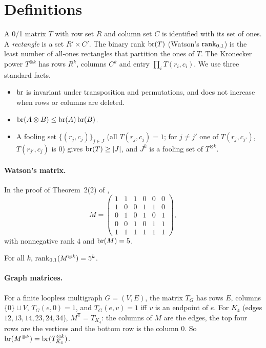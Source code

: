 \section{Definitions}

A 0/1 matrix $T$ with row set $R$ and column set $C$ is identified with its set of ones. A \emph{rectangle} is a set $R'\times C'$. The binary rank $\operatorname{br}(T)$ (Watson's $\operatorname{rank}_{0,1}$) is the least number of all-ones rectangles that partition the ones of $T$. The Kronecker power $T^{\otimes k}$ has rows $R^k$, columns $C^k$ and entry $\prod_i T(r_i,c_i)$. We use three standard facts.
\begin{itemize}
\item[(F1)] $\operatorname{br}$ is invariant under transposition and permutations, and does not increase when rows or columns are deleted.
\item[(F2)] $\operatorname{br}(A\otimes B)\le\operatorname{br}(A)\operatorname{br}(B)$.
\item[(F3)] A fooling set $\{(r_j,c_j)\}_{j\in J}$ (all $T(r_j,c_j)=1$; for $j\neq j'$ one of $T(r_j,c_{j'})$, $T(r_{j'},c_j)$ is $0$) gives $\operatorname{br}(T)\ge|J|$, and $J^k$ is a fooling set of $T^{\otimes k}$.
\end{itemize}

\paragraph{Watson's matrix.} In the proof of Theorem~2(2) of \cite{Wa16},
\[
M=\begin{pmatrix}1&1&1&0&0&0\\1&0&0&1&1&0\\0&1&0&1&0&1\\0&0&1&0&1&1\\1&1&1&1&1&1\end{pmatrix},
\]
with nonnegative rank $4$ and $\operatorname{br}(M)=5$.
\begin{conjecture}
For all $k$, $\operatorname{rank}_{0,1}(M^{\otimes k})=5^k$.
\end{conjecture}

\paragraph{Graph matrices.} For a finite loopless multigraph $G=(V,E)$, the matrix $T_G$ has rows $E$, columns $\{0\}\sqcup V$, $T_G(e,0)=1$, and $T_G(e,v)=1$ iff $v$ is an endpoint of $e$. For $K_4$ (edges $12,13,14,23,24,34$), $M^{\mathsf T}=T_{K_4}$: the columns of $M$ are the edges, the top four rows are the vertices and the bottom row is the column $0$. So $\operatorname{br}(M^{\otimes k})=\operatorname{br}(T_{K_4}^{\otimes k})$.

